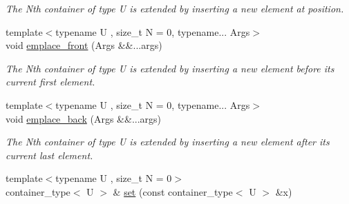 \begin{DoxyCompactItemize}
\begin{DoxyCompactList}\small\item\em The Nth container of type U is extended by inserting a new element at position. \end{DoxyCompactList}\item 
\hypertarget{classheterogeneous_1_1heterodeque_3_01_t_00_01_types_8_8_8_4_ac23d7efd5678583441800bb516d9db53}{}{\footnotesize template$<$typename U , size\+\_\+t N = 0, typename... Args$>$ }\\void \hyperlink{classheterogeneous_1_1heterodeque_3_01_t_00_01_types_8_8_8_4_ac23d7efd5678583441800bb516d9db53}{emplace\+\_\+front} (Args \&\&...args)\label{classheterogeneous_1_1heterodeque_3_01_t_00_01_types_8_8_8_4_ac23d7efd5678583441800bb516d9db53}

\begin{DoxyCompactList}\small\item\em The Nth container of type U is extended by inserting a new element before its current first element. \end{DoxyCompactList}\item 
\hypertarget{classheterogeneous_1_1heterodeque_3_01_t_00_01_types_8_8_8_4_a8aaa45d5292ce3a68d82ceb3f41f2ef1}{}{\footnotesize template$<$typename U , size\+\_\+t N = 0, typename... Args$>$ }\\void \hyperlink{classheterogeneous_1_1heterodeque_3_01_t_00_01_types_8_8_8_4_a8aaa45d5292ce3a68d82ceb3f41f2ef1}{emplace\+\_\+back} (Args \&\&...args)\label{classheterogeneous_1_1heterodeque_3_01_t_00_01_types_8_8_8_4_a8aaa45d5292ce3a68d82ceb3f41f2ef1}

\begin{DoxyCompactList}\small\item\em The Nth container of type U is extended by inserting a new element after its current last element. \end{DoxyCompactList}\item 
\hypertarget{classheterogeneous_1_1heterodeque_3_01_t_00_01_types_8_8_8_4_aa7d6d0f4a15a6f2a9d302b8e7727cf3a}{}{\footnotesize template$<$typename U , size\+\_\+t N = 0$>$ }\\container\+\_\+type$<$ U $>$ \& \hyperlink{classheterogeneous_1_1heterodeque_3_01_t_00_01_types_8_8_8_4_aa7d6d0f4a15a6f2a9d302b8e7727cf3a}{set} (const container\+\_\+type$<$ U $>$ \&x)\label{classheterogeneous_1_1heterodeque_3_01_t_00_01_types_8_8_8_4_aa7d6d0f4a15a6f2a9d302b8e7727cf3a}


\end{DoxyCompactItemize}
